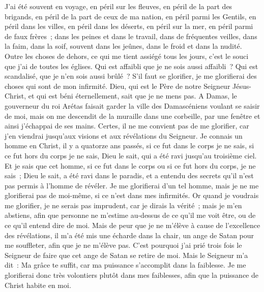 \begin{multicols}{2}
J'ai été souvent en voyage, en péril sur les fleuves, en péril de la part des brigands, en péril de la part de ceux de ma nation, en péril parmi les Gentils, en péril dans les villes, en péril dans les déserts, en péril sur la mer, en péril parmi de faux frères~;
dans les peines et dans le travail, dans de fréquentes veilles, dans la faim, dans la soif, souvent dans les jeûnes, dans le froid et dans la nudité.
Outre les choses de dehors, ce qui me tient assiégé tous les jours, c'est le souci que j'ai de toutes les églises.
Qui est affaibli que je ne sois aussi affaibli~? Qui est scandalisé, que je n'en sois aussi brûlé~?
S'il faut se glorifier, je me glorifierai des choses qui sont de mon infirmité.
Dieu, qui est le Père de notre Seigneur Jésus-Christ, et qui est béni éternellement, sait que je ne mens pas.
A Damas, le gouverneur du roi Arétas faisait garder la ville des Damascéniens voulant se saisir de moi,
mais on me descendit de la muraille dans une corbeille, par une fenêtre et ainsi j'échappai de ses mains.
\VerseOne{}Certes, il ne me convient pas de me glorifier, car j'en viendrai jusqu'aux visions et aux révélations du Seigneur.
Je connais un homme en Christ, il y a quatorze ans passés, si ce fut dans le corps je ne sais, si ce fut hors du corps je ne sais, Dieu le sait, qui a été ravi jusqu'au troisième ciel.
Et je sais que cet homme, si ce fut dans le corps ou si ce fut hors du corps, je ne sais~; Dieu le sait,
a été ravi dans le paradis, et a entendu des secrets qu'il n'est pas permis à l'homme de révéler.
Je me glorifierai d'un tel homme, mais je ne me glorifierai pas de moi-même, si ce n'est dans mes infirmités.
Or quand je voudrais me glorifier, je ne serais pas imprudent, car je dirais la vérité~; mais je m'en abstiens, afin que personne ne m'estime au-dessus de ce qu'il me voit être, ou de ce qu'il entend dire de moi.
Mais de peur que je ne m'élève à cause de l'excellence des révélations, il m'a été mis une écharde dans la chair, un ange de Satan pour me souffleter, afin que je ne m'élève pas.
C'est pourquoi j'ai prié trois fois le Seigneur de faire que cet ange de Satan se retire de moi.
Mais le Seigneur m'a dit~: Ma grâce te suffit, car ma puissance s'accomplit dans la faiblesse. Je me glorifierai donc très volontiers plutôt dans mes faiblesses, afin que la puissance de Christ habite en moi.

\end{multicols}

